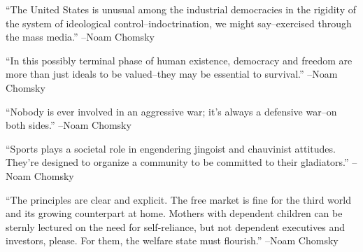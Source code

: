 \documentclass{article}%
\begin{document}
\linebreak%
\vspace{1mm}%
\begin{minipage}{\textwidth}%
\flushleft%
“The United States is unusual among the industrial democracies in the rigidity of the system of ideological control–indoctrination, we might say–exercised through the mass media.”%
\linebreak%
\vspace{1mm}%
–Noam Chomsky%
\linebreak%
\vspace{1mm}%
\end{minipage}%
\linebreak%
\vspace{1mm}%
\begin{minipage}{\textwidth}%
\flushleft%
“In this possibly terminal phase of human existence, democracy and freedom are more than just ideals to be valued–they may be essential to survival.”%
\linebreak%
\vspace{1mm}%
–Noam Chomsky%
\linebreak%
\vspace{1mm}%
\end{minipage}%
\linebreak%
\vspace{1mm}%
\begin{minipage}{\textwidth}%
\flushleft%
“Nobody is ever involved in an aggressive war; it's always a defensive war–on both sides.”%
\linebreak%
\vspace{1mm}%
–Noam Chomsky%
\linebreak%
\vspace{1mm}%
\end{minipage}%
\linebreak%
\vspace{1mm}%
\begin{minipage}{\textwidth}%
\flushleft%
“Sports plays a societal role in engendering jingoist and chauvinist attitudes. They're designed to organize a community to be committed to their gladiators.”%
\linebreak%
\vspace{1mm}%
–Noam Chomsky%
\linebreak%
\vspace{1mm}%
\end{minipage}%
\linebreak%
\vspace{1mm}%
\begin{minipage}{\textwidth}%
\flushleft%
“The principles are clear and explicit. The free market is fine for the third world and its growing counterpart at home. Mothers with dependent children can be sternly lectured on the need for self{-}reliance, but not dependent executives and investors, please. For them, the welfare state must flourish.”%
\linebreak%
\vspace{1mm}%
–Noam Chomsky%
\linebreak%
\vspace{1mm}%
\end{minipage}%
\end{document}
